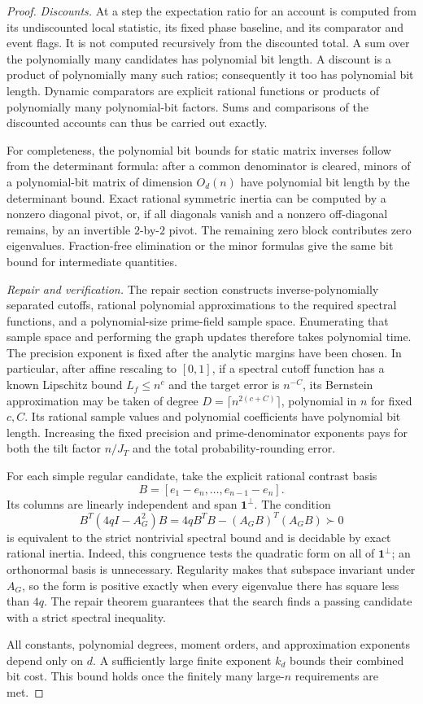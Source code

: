 \begin{proof}
\textit{Discounts.}
At a step the expectation ratio for an account is computed from its
undiscounted local statistic, its fixed phase baseline, and its
comparator and event flags.  It is not computed recursively from the
discounted total.  A sum over the polynomially many candidates has
polynomial bit length.  A discount is a product of polynomially many
such ratios; consequently it too has polynomial bit length.  Dynamic
comparators are explicit rational functions or products of polynomially
many polynomial-bit factors.  Sums and comparisons of the discounted
accounts can thus be carried out exactly.

For completeness, the polynomial bit bounds for static matrix inverses
follow from the determinant formula: after a common denominator is
cleared, minors of a polynomial-bit matrix of dimension $O_d(n)$ have
polynomial bit length by the determinant bound.  Exact rational symmetric
inertia can be computed by a nonzero diagonal pivot, or, if all diagonals
vanish and a nonzero off-diagonal remains, by an invertible $2$-by-$2$
pivot.  The remaining zero block contributes zero eigenvalues.
Fraction-free elimination \cite[Section~I]{Bareiss1968} or the minor formulas
give the same bit bound
for intermediate quantities.

\textit{Repair and verification.}
The repair section constructs inverse-polynomially separated cutoffs,
rational polynomial approximations to the required spectral functions,
and a polynomial-size prime-field sample space.  Enumerating that sample
space and performing the graph updates therefore takes polynomial time.
The precision exponent is fixed after the analytic margins have been
chosen.  In particular, after affine rescaling to $[0,1]$, if a spectral
cutoff function has a known Lipschitz bound $L_f\le n^c$ and the target
error is $n^{-C}$, its
Bernstein approximation may be taken of degree
$D=\lceil n^{2(c+C)}\rceil$, polynomial in $n$ for fixed $c,C$.
Its rational sample values and polynomial coefficients have polynomial
bit length.  Increasing the fixed precision and prime-denominator
exponents pays for both the tilt factor $n/J_T$ and the total
probability-rounding error.

For each simple regular candidate, take the explicit rational contrast basis
\[
 B=[e_1-e_n,\ldots,e_{n-1}-e_n].
\]
Its columns are linearly independent and span $\mathbf1^\perp$.
The condition
\[
 B^T(4qI-A_G^2)B
 =4qB^TB-(A_GB)^T(A_GB)\succ0
\]
is equivalent to the strict nontrivial spectral bound and is decidable
by exact rational inertia.  Indeed, this congruence tests the quadratic
form on all of $\mathbf1^\perp$; an orthonormal basis is unnecessary.
Regularity makes that subspace invariant under $A_G$, so the form is
positive exactly when every eigenvalue there has square less than $4q$.
The repair theorem guarantees that the search
finds a passing candidate with a strict spectral inequality.

All constants, polynomial degrees, moment orders, and approximation
exponents depend only on $d$.  A sufficiently large finite exponent
$k_d$ bounds their combined bit cost.  This bound holds once the finitely many large-$n$ requirements are met.
\end{proof}

